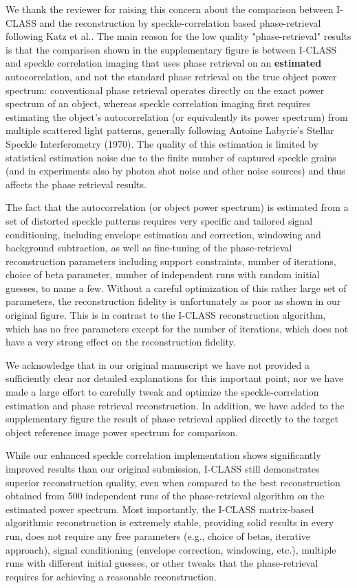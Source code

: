 \documentclass[12pt]{article}
\newenvironment{ourresponse}
    {\begin{tcolorbox}[width=\linewidth,breakable,enhanced,colback=gray!5,colframe=responsecolor!50,title=Response,left=5pt,right=5pt]}
    {\end{tcolorbox}}
\begin{document}
\begin{ourresponse}
    We thank the reviewer for raising this concern about the comparison between I-CLASS and the reconstruction by speckle-correlation based phase-retrieval following Katz et al.\cite{katz14}. The main reason for the low quality "phase-retrieval" results is that the comparison shown in the supplementary figure is between I-CLASS and speckle correlation imaging that uses phase retrieval on an \textbf{estimated} autocorrelation, and not the standard phase retrieval on the true object power spectrum: conventional phase retrieval operates directly on the exact power spectrum of an object, whereas speckle correlation imaging first requires estimating the object's autocorrelation (or equivalently its power spectrum) from multiple scattered light patterns, generally following Antoine Labyrie's Stellar Speckle Interferometry (1970)\cite{labeyrie1970attainment}. The quality of this estimation is limited by statistical estimation noise due to the finite number of captured speckle grains (and in experiments also by photon shot noise and other noise sources) and thus affects the phase retrieval results.

    The fact that the autocorrelation (or object power spectrum) is estimated from a set of distorted speckle patterns requires very specific and tailored signal conditioning, including envelope estimation and correction, windowing and background subtraction, as well as fine-tuning of the phase-retrieval reconstruction parameters including support constraints, number of iterations, choice of beta parameter, number of independent runs with random initial guesses, to name a few. Without a careful optimization of this rather large set of parameters, the reconstruction fidelity is unfortunately as poor as shown in our original figure. This is in contrast to the I-CLASS reconstruction algorithm, which has no free parameters except for the number of iterations, which does not have a very strong effect on the reconstruction fidelity.
    
    We acknowledge that in our original manuscript we have not provided a sufficiently clear nor detailed explanations for this important point, nor we have made a large effort to carefully tweak and optimize the speckle-correlation estimation and phase retrieval reconstruction. In addition, we have added to the supplementary figure the result of phase retrieval applied directly to the target object reference image power spectrum for comparison. 
    
    While our enhanced speckle correlation implementation shows significantly improved results than our original submission, I-CLASS still demonstrates superior reconstruction quality, even when compared to the best reconstruction obtained from 500 independent runs of the phase-retrieval algorithm on the estimated power spectrum. Most importantly, the I-CLASS matrix-based algorithmic reconstruction is extremely stable, providing solid results in every run, does not require any free parameters (e.g., choice of betas, iterative approach), signal conditioning (envelope correction, windowing, etc.), multiple runs with different initial guesses, or other tweaks that the phase-retrieval requires for achieving a reasonable reconstruction. 
    

\end{ourresponse}
\end{document}
